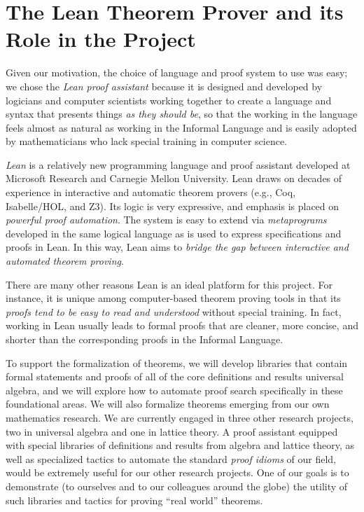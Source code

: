 \documentclass[12pt]{amsart}  %
\begin{document}
\section{The Lean Theorem Prover and its Role in the Project}
Given our motivation, the choice of language and proof system to use was easy; we chose the \emph{Lean proof assistant} because it is designed and developed by logicians and computer scientists working together to create a language and syntax that presents things \emph{as they should be}, so that the working in the language feels almost as natural as working in the Informal Language and is easily adopted by mathematicians who lack special training in computer science. 

\emph{Lean} is a relatively new programming language and proof assistant developed at Microsoft Research and Carnegie Mellon University. Lean draws on decades of experience in interactive and automatic theorem provers (e.g., Coq, Isabelle/HOL, and Z3). Its logic is very expressive, and emphasis is placed on \emph{powerful proof automation}. The system is easy to extend via \emph{metaprograms} developed in the same logical language as is used to express specifications and proofs in Lean. In this way, Lean aims to \emph{bridge the gap between interactive and automated theorem proving}.

There are many other reasons Lean is an ideal platform for this project.
For instance, it is unique among computer-based theorem proving tools in that its
\emph{proofs tend to be easy to read and understood} without special training. 
In fact, working in Lean usually leads to formal proofs that are cleaner, more concise, 
and shorter than the corresponding proofs in the Informal Language.

To support the formalization of theorems, we will develop libraries that contain formal statements and proofs of all of the core definitions and results universal algebra, and we will explore how to automate proof search specifically in these foundational areas.  We will also formalize theorems emerging from our own mathematics research. We are currently engaged in three other research projects, two in universal algebra and one in lattice theory.  A proof assistant equipped with special libraries of definitions and results from algebra and lattice theory, as well as specialized tactics to automate the standard \emph{proof idioms} of our field, would be extremely useful for our other research projects. One of our goals is to demonstrate (to ourselves and to our colleagues around the globe) the utility of such libraries and tactics for proving ``real world'' theorems.
\end{document}
